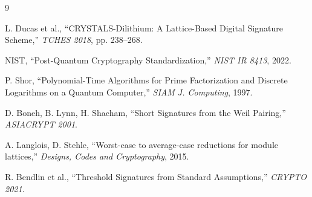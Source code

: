 \documentclass[11pt,a4paper]{article}
\begin{document}

\begin{thebibliography}{9}

L. Ducas et al., ``CRYSTALS-Dilithium: A Lattice-Based Digital Signature Scheme,'' \textit{TCHES 2018}, pp. 238--268.

NIST, ``Post-Quantum Cryptography Standardization,'' \textit{NIST IR 8413}, 2022.

P. Shor, ``Polynomial-Time Algorithms for Prime Factorization and Discrete Logarithms on a Quantum Computer,'' \textit{SIAM J. Computing}, 1997.

D. Boneh, B. Lynn, H. Shacham, ``Short Signatures from the Weil Pairing,'' \textit{ASIACRYPT 2001}.

A. Langlois, D. Stehle, ``Worst-case to average-case reductions for module lattices,'' \textit{Designs, Codes and Cryptography}, 2015.

R. Bendlin et al., ``Threshold Signatures from Standard Assumptions,'' \textit{CRYPTO 2021}.

\end{thebibliography}
\end{document}

